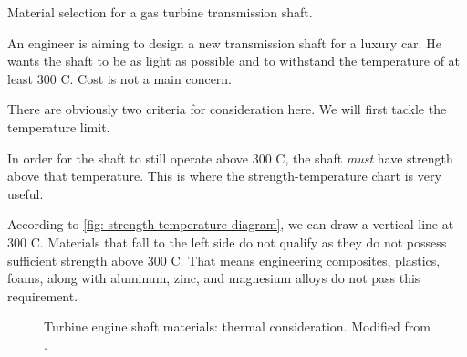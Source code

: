 \documentclass[
10pt,
a4paper,
openany,
svgnames,
]{book}
\begin{document}
\begin{example} Material selection for a gas turbine transmission shaft.

  An engineer is aiming to design a new transmission shaft for a luxury car. He wants the shaft to be as light as possible and to withstand the temperature of at least 300 C. Cost is not a main concern.

\end{example}
\begin{solution}
  There are obviously two criteria for consideration here. We will first tackle the temperature limit.

  In order for the shaft to still operate above 300 C, the shaft \emph{must} have strength above that temperature. This is where the strength-temperature chart is very useful.

  According to \cref{fig: strength temperature diagram}, we can draw a vertical line at 300 C. Materials that fall to the left side do not qualify as they do not possess sufficient strength above 300 C. That means engineering composites, plastics, foams, along with aluminum, zinc, and magnesium alloys do not pass this requirement.
  
  \begin{figure}[H]
    \centering
    \caption{Turbine engine shaft materials: thermal consideration. Modified from \cite{ashby2010materials}.}
  \end{figure} 


\end{solution}
\end{document}
